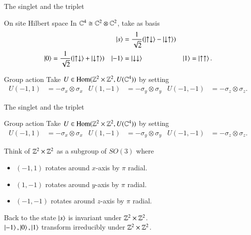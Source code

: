 \documentclass{beamer}
\begin{document}
\begin{frame}{The singlet and the triplet}
	\begin{block}{On site Hilbert space}
		In $\mathbb{C}^4\cong \mathbb{C}^2\otimes \mathbb{C}^2$, take as basis
		\begin{align*}
			&&\ket{s}&=\frac{1}{\sqrt{2}}(\ket{\uparrow\downarrow}-\ket{\downarrow\uparrow})&&\\
			\ket{0}&=\frac{1}{\sqrt{2}}(\ket{\uparrow\downarrow}+\ket{\downarrow\uparrow})&\ket{-1}&=\ket{\downarrow\downarrow}&\ket{1}&=\ket{\uparrow\uparrow}.
		\end{align*}
	\end{block}
	\pause
	\begin{block}{Group action}
		Take $U\in \textrm{Hom}(\mathbb{Z}^2\times \mathbb{Z}^2,U(\mathbb{C}^4))$ by setting
		\begin{align*}
		U(-1,1)&=-\sigma_x\otimes \sigma_x&U(1,-1)&=-\sigma_y\otimes \sigma_y&U(-1,-1)&=-\sigma_z\otimes \sigma_z.
		\end{align*}
	\end{block}
\end{frame}

\begin{frame}{The singlet and the triplet}
	\begin{block}{Group action}
		Take $U\in \textrm{Hom}(\mathbb{Z}^2\times \mathbb{Z}^2,U(\mathbb{C}^4))$ by setting
		\begin{align*}
		U(-1,1)&=-\sigma_x\otimes \sigma_x&U(1,-1)&=-\sigma_y\otimes \sigma_y&U(-1,-1)&=-\sigma_z\otimes \sigma_z.
		\end{align*}
	\end{block}
	Think of $\mathbb{Z}^2\times \mathbb{Z}^2$ as a subgroup of $SO(3)$ where
	\begin{itemize}
		\item $(-1,1)$ rotates around $x$-axis by $\pi$ radial.
		\item $(1,-1)$ rotates around $y$-axis by $\pi$ radial.
		\item $(-1,-1)$ rotates around $z$-axis by $\pi$ radial.
	\end{itemize}
	\pause
	\begin{block}{Back to the state}
		$\ket{s}$ is invariant under $\mathbb{Z}^2\times \mathbb{Z}^2$.\\
		$\ket{-1},\ket{0},\ket{1}$ transform irreducibly under $\mathbb{Z}^2\times \mathbb{Z}^2$.
	\end{block}
\end{frame}
\end{document}
